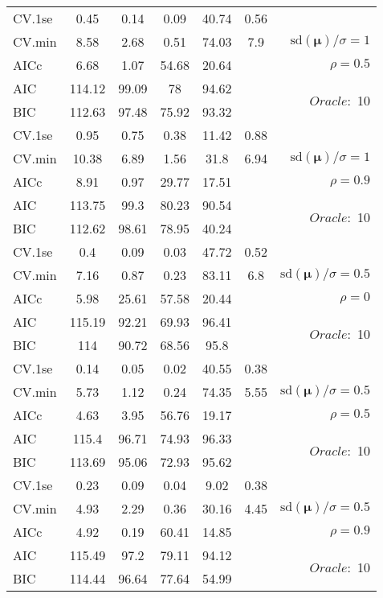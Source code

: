 \begin{table}
\begin{center}
\begin{tabular}{l*{5}{c}|r}
 \hline 
CV.1se & 0.45 & 0.14 & 0.09 & 40.74 & 0.56 & \\
CV.min & 8.58 & 2.68 & 0.51 & 74.03 & 7.9 &  $\mathrm{sd}(\mathbf{\mu})/\sigma=1$ \\
AICc & 6.68 & 1.07 & 54.68 & 20.64 & & $\rho=0.5$ \\
AIC & 114.12 & 99.09 & 78 & 94.62 & &  \multirow{2}{*}{$Oracle: $ 10} \\
BIC & 112.63 & 97.48 & 75.92 & 93.32 & &  \\
 \hline 
CV.1se & 0.95 & 0.75 & 0.38 & 11.42 & 0.88 & \\
CV.min & 10.38 & 6.89 & 1.56 & 31.8 & 6.94 &  $\mathrm{sd}(\mathbf{\mu})/\sigma=1$ \\
AICc & 8.91 & 0.97 & 29.77 & 17.51 & & $\rho=0.9$ \\
AIC & 113.75 & 99.3 & 80.23 & 90.54 & &  \multirow{2}{*}{$Oracle: $ 10} \\
BIC & 112.62 & 98.61 & 78.95 & 40.24 & &  \\
 \hline 
CV.1se & 0.4 & 0.09 & 0.03 & 47.72 & 0.52 & \\
CV.min & 7.16 & 0.87 & 0.23 & 83.11 & 6.8 &  $\mathrm{sd}(\mathbf{\mu})/\sigma=0.5$ \\
AICc & 5.98 & 25.61 & 57.58 & 20.44 & & $\rho=0$ \\
AIC & 115.19 & 92.21 & 69.93 & 96.41 & &  \multirow{2}{*}{$Oracle: $ 10} \\
BIC & 114 & 90.72 & 68.56 & 95.8 & &  \\
 \hline 
CV.1se & 0.14 & 0.05 & 0.02 & 40.55 & 0.38 & \\
CV.min & 5.73 & 1.12 & 0.24 & 74.35 & 5.55 &  $\mathrm{sd}(\mathbf{\mu})/\sigma=0.5$ \\
AICc & 4.63 & 3.95 & 56.76 & 19.17 & & $\rho=0.5$ \\
AIC & 115.4 & 96.71 & 74.93 & 96.33 & &  \multirow{2}{*}{$Oracle: $ 10} \\
BIC & 113.69 & 95.06 & 72.93 & 95.62 & &  \\
 \hline 
CV.1se & 0.23 & 0.09 & 0.04 & 9.02 & 0.38 & \\
CV.min & 4.93 & 2.29 & 0.36 & 30.16 & 4.45 &  $\mathrm{sd}(\mathbf{\mu})/\sigma=0.5$ \\
AICc & 4.92 & 0.19 & 60.41 & 14.85 & & $\rho=0.9$ \\
AIC & 115.49 & 97.2 & 79.11 & 94.12 & &  \multirow{2}{*}{$Oracle: $ 10} \\
BIC & 114.44 & 96.64 & 77.64 & 54.99 & &  \\
 \hline 
\end{tabular}
\end{center}
\vspace{-1cm}
\end{table}




